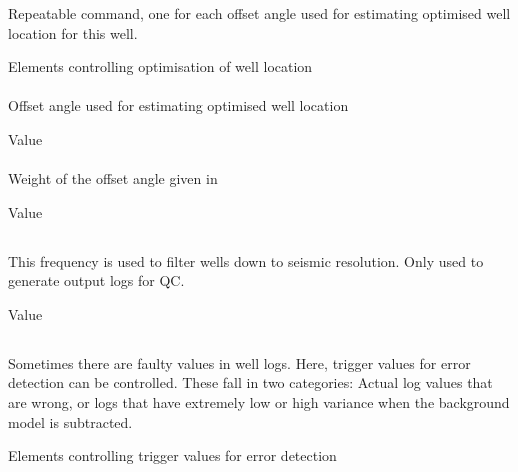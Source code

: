 \subsubsection{}
 \slist
   \item \Description Repeatable command, one for each offset angle used for estimating optimised well location for this well.
   \item \Argument Elements controlling optimisation of well location
   \item \Default
 \elist

\paragraph{}
 \slist
    \item \Description Offset angle used for estimating optimised well location
    \item \Argument Value
    \item \Default
 \elist

\paragraph{}
 \slist
    \item \Description Weight of the offset angle given in 
    \item \Argument Value
    \item {}
 \elist

\subsection{}
 \slist
   \item \Description This frequency is used to filter wells down to seismic resolution. Only used to generate output logs for QC.
   \item \Argument Value
   \item \Default
 \elist

\subsection{}
 \slist
   \item \Description Sometimes there are faulty values in well logs. Here, trigger values for error detection can be controlled. These fall in two categories: Actual log values that are wrong, or logs that have extremely low or high variance when the background model is subtracted.
   \item \Argument Elements controlling trigger values for error detection
   \item \Default
 \elist

